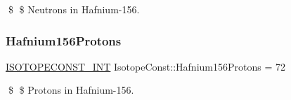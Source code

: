 \$ \$ Neutrons in Hafnium-\/156. \mbox{\label{group___isotope_const-_hafnium-_hf156_ga418690baa65bfd5ecd5c663655f0558d}} 
\subsubsection{\texorpdfstring{Hafnium156\+Protons}{Hafnium156Protons}}
{\footnotesize\ttfamily \mbox{\hyperlink{group___isotope_const-_macros_ga5f18360b3e99483a35c32d789e62621c}{I\+S\+O\+T\+O\+P\+E\+C\+O\+N\+S\+T\+\_\+\+I\+NT}} Isotope\+Const\+::\+Hafnium156\+Protons = 72}

\$ \$ Protons in Hafnium-\/156. 
